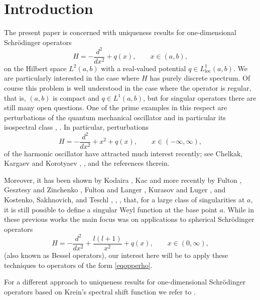 \documentclass{amsart}
\numberwithin{equation}{section}
\begin{document}
\section{Introduction}
\label{sec:int}

The present paper is concerned with uniqueness results for one-dimensional Schr\"o\-dinger operators
\begin{equation}
H = -\frac{d^2}{dx^2} + q(x), \qquad x\in (a,b),
\end{equation}
on the Hilbert space $L^2(a,b)$ with a real-valued potential $q\in L^1_{\mathrm{loc}}(a,b)$. We are particularly interested
in the case where $H$ has purely discrete spectrum. Of course this problem is well understood in the case where the
operator is regular, that is, $(a,b)$ is compact and $q\in L^1(a,b)$, but for singular operators there are still many
open questions. One of the prime examples in this respect are perturbations of the quantum mechanical oscillator and in
particular its isospectral class \cite{le}, \cite{mktr}. In particular, perturbations 
\begin{equation}\label{eqopperho}
H = -\frac{d^2}{dx^2} + x^2 + q(x), \qquad x\in (-\infty,\infty),
\end{equation}
of the harmonic oscillator have attracted much interest recently; see Chelkak, Kargaev and Korotyaev \cite{chelkak}, \cite{ckk}, \cite{ckk2}
and the references therein.

Moreover, it has been shown by Kodaira \cite{ko}, Kac \cite{ka} and more recently by Fulton \cite{ful08}, Gesztesy and Zinchenko \cite{gz},
Fulton and Langer \cite{fl}, Kurasov and Luger \cite{kl}, and Kostenko, Sakhnovich, and Teschl \cite{kt}, \cite{kst}, \cite{kst2}, \cite{kst3}
that, for a large class of singularities at $a$, it is still possible to define a singular Weyl function at the base point $a$.
While in these previous works the main focus was on applications to spherical Schr\"odinger operators
\begin{equation}\label{eqopperbe}
H = -\frac{d^2}{dx^2} + \frac{l(l+1)}{x^2} + q(x), \qquad x\in (0,\infty),
\end{equation}
(also known as Bessel operators), our interest here will be to apply these techniques to operators of the form \eqref{eqopperho}.

For a different approach to uniqueness results for one-dimensional Schr\"odinger operators based on Krein's spectral shift
function we refer to \cite{gs1}.
\end{document}
